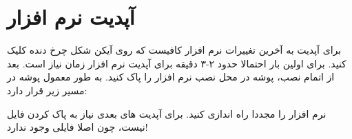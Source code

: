 \section{آپدیت نرم افزار}
برای آپدیت به آخرین تغییرات نرم افزار کافیست که روی آیکن شکل چرخ دنده کلیک کنید. برای اولین بار احتمالا حدود ۲-۳ دقیقه برای آپدیت نرم افزار زمان نیاز است.
بعد از اتمام نصب، پوشه 
در محل نصب نرم افزار را پاک کنید. به طور معمول پوشه 
در مسیر زیر قرار دارد:

\begin{center}
    
\end{center}


نرم افزار را مجددا راه اندازی کنید. برای آپدیت های بعدی نیاز به پاک کردن فایل نیست، چون اصلا فایلی وجود ندارد!
